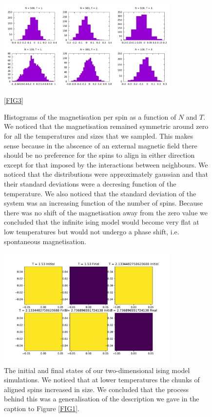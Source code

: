 \documentclass[a4paper]{article}
\begin{document}
    \begin{figure}
        \centering
        \includegraphics[width=0.8\textwidth]{pub/figures/q1e.pdf}
        \caption{Histograms of the magnetisation per spin as a function of %
            \(N\) and \(T\). We noticed that the magnetisation remained %
            symmetric around zero for all the temperatures and sizes that we %
            sampled. This makes sense because in the abscence of an external %
            magnetic field there should be no preference for the spins to %
            align in either direction except for that imposed by the %
            interactions between neighbours. We noticed that the distributions %
            were approximately gaussian and that their standard deviations %
            were a decresing function of the temperature. We also noticed %
            that the standard deviation of the system was an increasing %
            function of the number of spins. Because there was no shift of %
            the magnetisation away from the zero value we concluded that %
            the infinite ising model would become very flat at low %
            temperatures but would not undergo a phase shift, i.e. spontaneous %
            magnetisation.}
        \ref{FIG3}
    \end{figure}
    
    \begin{figure}
        \centering
        \includegraphics[width=0.8\textwidth]{pub/figures/q2a.pdf}
        \caption{The initial and final states of our two-dimensional ising %
            model simulations. We noticed that at lower temperatures the %
            chunks of aligned spins increased in size. We concluded that %
            the process behind this was a generalisation of the description %
            we gave in the caption to Figure \ref{FIG1}.}
        \label{FIG4}
    \end{figure}
\end{document}
